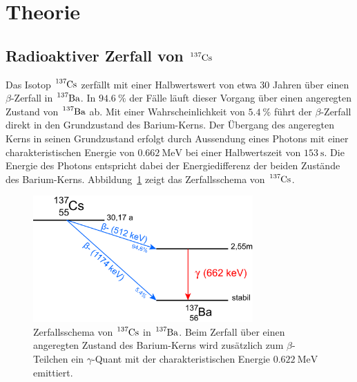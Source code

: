 \section{Theorie}
\label{sec:theorie}

\subsection{Radioaktiver Zerfall von $\ce{^{137}Cs}$}
Das Isotop $\ce{^{137}Cs}$ zerfällt mit einer Halbwertswert von etwa $30$ Jahren
über einen $\beta$-Zerfall in $\ce{^{137}Ba}$. In $\SI{94.6}{\percent}$ der
Fälle läuft dieser Vorgang über einen angeregten Zustand von $\ce{^{137}Ba}$ ab.
Mit einer Wahrscheinlichkeit von $\SI{5.4}{\percent}$ führt der $\beta$-Zerfall
direkt in den Grundzustand des Barium-Kerns. Der Übergang des angeregten Kerns
in seinen Grundzustand erfolgt durch Aussendung eines Photons mit einer
charakteristischen Energie von $\SI{0.662}{\mega\electronvolt}$ bei einer
Halbwertszeit von $\SI{153}{\second}$. Die Energie des Photons entspricht dabei
der Energiedifferenz der beiden Zustände des Barium-Kerns.
Abbildung~\ref{fig:zerfallsschema} zeigt das Zerfallsschema von $\ce{^{137}Cs}$.

\begin{figure}
  \centering
  \includegraphics[width=0.75\textwidth]{figures/cs137_Zerfallsschema.png}
  \caption{Zerfallsschema von $\ce{^{137}Cs}$ in $\ce{^{137}Ba}$. Beim Zerfall
  über einen angeregten Zustand des Barium-Kerns wird zusätzlich zum
  $\beta$-Teilchen ein $\gamma$-Quant mit der charakteristischen Energie
  $\SI{0.622}{\mega\electronvolt}$ emittiert.}
  \label{fig:zerfallsschema}
\end{figure}

